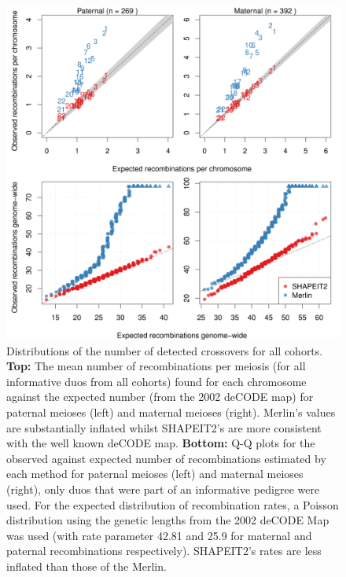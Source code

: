 \begin{figure}
 \begin{center} 
 \includegraphics[width=\textwidth]{chap4figs/Fig5}
   \caption[Distributions of the number of detected crossovers for all cohorts]{Distributions of the number of detected crossovers for all cohorts. \textbf{Top:} The mean number of recombinations per meiosis (for all informative duos from all cohorts) found for each chromosome against the expected number (from the 2002 deCODE map) for paternal meioses (left) and  maternal meioses (right). Merlin's values are substantially inflated whilst SHAPEIT2's are more consistent with the well known deCODE map. \textbf{Bottom:}  Q-Q plots for the observed against expected number of recombinations estimated by each method for paternal meioses (left) and maternal meioses (right), only duos that were part of an informative pedigree were used.  For the expected distribution of recombination rates, a Poisson distribution using the genetic lengths from the 2002 deCODE Map was used (with rate parameter 42.81 and 25.9 for maternal and paternal recombinations respectively).  SHAPEIT2's rates are less inflated than those of the Merlin.\label{fig:rec_summary_2}}
 \end{center} 
\end{figure}

